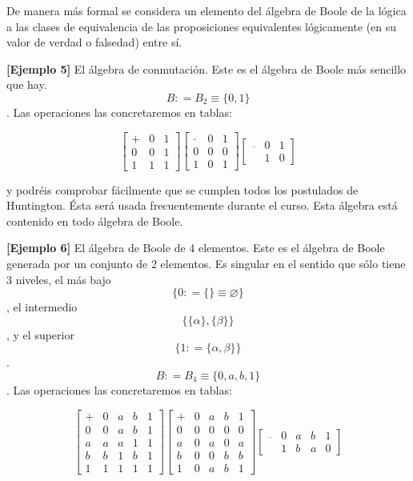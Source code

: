 \begin{enumerate}
  De manera más formal se considera un elemento del álgebra de Boole de
  la lógica a las clases de equivalencia de las proposiciones
  equivalentes lógicamente (en su valor de verdad o falsedad) entre sí.

  \textbf{{[}Ejemplo 5{]}} El álgebra de conmutación. Este es el álgebra
  de Boole más sencillo que hay. \[B{{: = B_{2}} \equiv {\{{0,1}\}}}\].
  Las operaciones las concretaremos en tablas:

  \[\begin{bmatrix}
   + & 0 & 1 \\
  0 & 0 & 1 \\
  1 & 1 & 1
  \end{bmatrix}\begin{bmatrix}
   \cdot & 0 & 1 \\
  0 & 0 & 0 \\
  1 & 0 & 1
  \end{bmatrix}\begin{bmatrix}
  \overline{} & 0 & 1 \\
   & 1 & 0
  \end{bmatrix}\]

  y podréis comprobar fácilmente que se cumplen todos los postulados de
  Huntington. Ésta será usada frecuentemente durante el curso. Esta
  álgebra está contenido en todo álgebra de Boole.

  \textbf{{[}Ejemplo 6{]}} El álgebra de Boole de 4 elementos. Este es
  el álgebra de Boole generada por un conjunto de 2 elementos. Es
  singular en el sentido que sólo tiene 3 niveles, el más bajo
  \[\{{0{{: = {\{\}}} \equiv \varnothing}}\}\], el intermedio
  \[\{{{\{\alpha\}},{\{\beta\}}}\}\], y el superior
  \[\{{1{: = {\{{\alpha,\beta}\}}}}\}\].
  \[B{{: = B_{4}} \equiv {\{{0,a,b,1}\}}}\]. Las operaciones las
  concretaremos en tablas:

  \[\begin{bmatrix}
   + & 0 & a & b & 1 \\
  0 & 0 & a & b & 1 \\
  a & a & a & 1 & 1 \\
  b & b & 1 & b & 1 \\
  1 & 1 & 1 & 1 & 1
  \end{bmatrix}\begin{bmatrix}
   + & 0 & a & b & 1 \\
  0 & 0 & 0 & 0 & 0 \\
  a & 0 & a & 0 & a \\
  b & 0 & 0 & b & b \\
  1 & 0 & a & b & 1
  \end{bmatrix}\begin{bmatrix}
  \overline{} & 0 & a & b & 1 \\
   & 1 & b & a & 0
  \end{bmatrix}\]


\end{enumerate}
